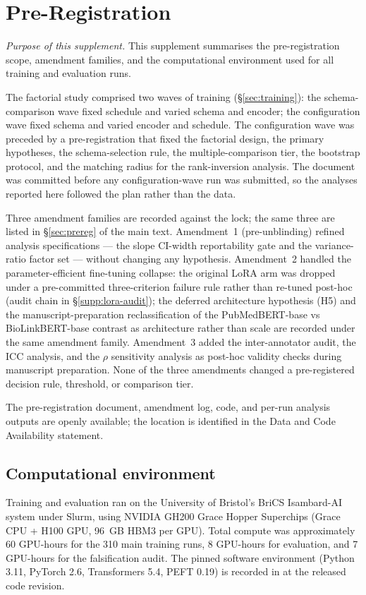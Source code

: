 \section{Pre-Registration}
\label{supp:prereg}

\textit{Purpose of this supplement.}\;
This supplement summarises the pre-registration scope, amendment
families, and the computational environment used for all training
and evaluation runs.

The factorial study comprised two waves of training
(\S\ref{sec:training}): the
schema-comparison wave fixed schedule and varied schema and encoder;
the configuration wave fixed schema and varied encoder and schedule.
The configuration wave was preceded by a pre-registration that fixed
the factorial design, the primary hypotheses, the schema-selection
rule, the multiple-comparison tier, the bootstrap protocol, and the
matching radius for the rank-inversion analysis. The document
was committed before any configuration-wave run was submitted, so
the analyses reported here followed the plan rather than the data.

Three amendment families are recorded against the lock; the same
three are listed in \S\ref{sec:prereg} of the main text. Amendment~1
(pre-unblinding) refined analysis specifications --- the slope
CI-width reportability gate and the variance-ratio factor set ---
without changing any hypothesis. Amendment~2 handled the
parameter-efficient fine-tuning collapse: the original LoRA arm
was dropped under a pre-committed three-criterion failure rule
rather than re-tuned post-hoc (audit chain in
\S\ref{supp:lora-audit}); the deferred architecture hypothesis
(H5) and the manuscript-preparation reclassification of the
PubMedBERT-base vs BioLinkBERT-base contrast as architecture
rather than scale are recorded under the same amendment family.
Amendment~3 added the inter-annotator audit, the ICC analysis, and
the $\rho$ sensitivity analysis as post-hoc validity checks during
manuscript preparation. None of the three amendments changed a
pre-registered decision rule, threshold, or comparison tier.

The pre-registration document, amendment log, code, and per-run
analysis outputs are openly available; the location is identified in
the Data and Code Availability statement.

\subsection{Computational environment}

Training and evaluation ran on the University of Bristol's BriCS
Isambard-AI system under Slurm, using NVIDIA GH200 Grace Hopper
Superchips (Grace CPU + H100 GPU, 96~GB HBM3 per GPU). Total
compute was approximately 60 GPU-hours for the 310 main training
runs, 8 GPU-hours for evaluation, and 7 GPU-hours for the
falsification audit. The pinned software environment (Python 3.11,
PyTorch 2.6, Transformers 5.4, PEFT 0.19) is recorded in
 at the released code revision.
